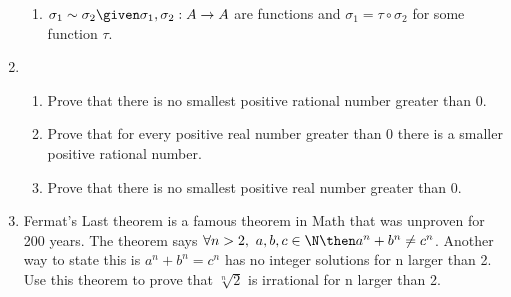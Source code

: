 \documentclass[basic, header]{nosvagor-notes}
\begin{document}
\begin{enumerate}[itemsep=5em]
\begin{enumerate}[itemsep=4em]
      \item \(\sigma_1 \sim \sigma_2 \given \sigma_1, \sigma_2 : A\to A\) are
        functions and \(\sigma_1 = \tau \circ \sigma_2 \) for some function \(\tau\).

    \end{enumerate}

  \item
    \begin{enumerate}[itemsep=4em]

      \item Prove that there is no smallest positive rational number greater
        than 0.

      \item Prove that for every positive real number greater than 0 there is a
        smaller positive rational number.

      \item Prove that there is no smallest positive real number greater than 0.

    \end{enumerate}

  \newpage %

  \item Fermat’s Last theorem is a famous theorem in Math that was unproven for
    200 years. The theorem says \(\forall n > 2,~ a,b,c \in \N \then  a^n +
    b^n \neq c^n\). Another way to state this is \(a^n + b^n = c^n\) has no integer
    solutions for n larger than 2. Use this theorem to prove that \(\sqrt[n]{2}\) is
    irrational for n larger than 2.

\end{enumerate}
\end{document}
